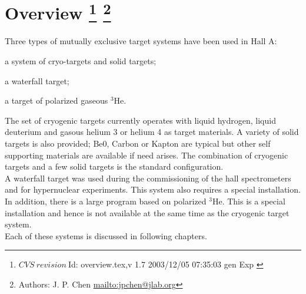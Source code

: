 \chapter[Overview]{ Overview
\footnote{
  $CVS~revision~ $Id: overview.tex,v 1.7 2003/12/05 07:35:03 gen Exp $ $ }
\footnote{Authors: J. P. Chen \url{mailto:jpchen@jlab.org}}
}
\label{sec:targets-overv}

Three types of mutually exclusive target systems have been used in Hall A:

\begin{list}{.~}{\setlength{\itemsep}{-0.15cm}}
  \item a system of cryo-targets and solid targets;
  \item a waterfall target;
  \item a target of polarized gaseous $^3$He.
\end{list}

The set of
cryogenic targets currently operates with liquid hydrogen, liquid
deuterium and gasous helium 3 or helium 4
as target materials.
A variety of solid targets is also provided; Be0, Carbon or
Kapton are typical but other self supporting materials are available if need arises.
The combination of cryogenic targets and a few solid targets is
the standard configuration. \\

A waterfall target was used during the commissioning of
the hall spectrometers and for hypernuclear experiments. This system also 
requires a special installation. \\

In addition,
there is a large program based on polarized $^3$He. This
is a special installation and hence is not available at the same
time as the cryogenic target system.\\

Each of these systems is discussed in following chapters.
%
%
%
%
%
%
%
